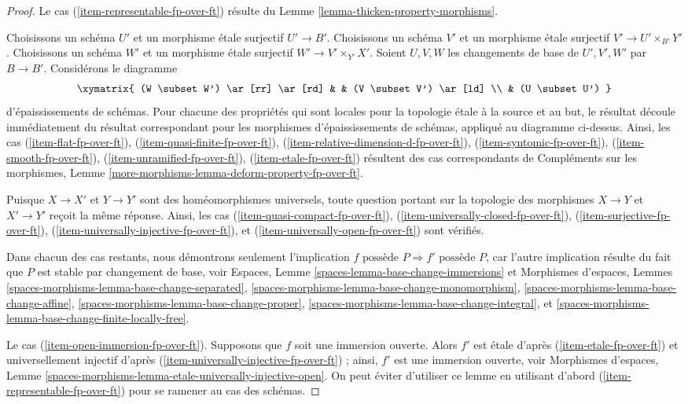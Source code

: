 \begin{proof}
Le cas (\ref{item-representable-fp-over-ft}) résulte du
Lemme \ref{lemma-thicken-property-morphisms}.

\medskip\noindent
Choisissons un schéma $U'$ et un morphisme étale surjectif $U' \to B'$.
Choisissons un schéma $V'$ et un morphisme étale surjectif
$V' \to U' \times_{B'} Y'$.
Choisissons un schéma $W'$ et un morphisme étale surjectif
$W' \to V' \times_{Y'} X'$. Soient $U, V, W$ les changements de base
de $U', V', W'$ par $B \to B'$. Considérons le diagramme
$$
\xymatrix{
(W \subset W') \ar[rr] \ar[rd] & & (V \subset V') \ar[ld] \\
& (U \subset U')
}
$$
d'épaississements de schémas. Pour chacune des propriétés qui sont
locales pour la topologie étale à la source et au but, le résultat découle immédiatement
du résultat correspondant pour les morphismes d'épaississements de schémas,
appliqué au diagramme ci-dessus. Ainsi, les cas
(\ref{item-flat-fp-over-ft}),
(\ref{item-quasi-finite-fp-over-ft}),
(\ref{item-relative-dimension-d-fp-over-ft}),
(\ref{item-syntomic-fp-over-ft}),
(\ref{item-smooth-fp-over-ft}),
(\ref{item-unramified-fp-over-ft}),
(\ref{item-etale-fp-over-ft})
résultent des cas correspondants de
Compléments sur les morphismes, Lemme \ref{more-morphisms-lemma-deform-property-fp-over-ft}.

\medskip\noindent
Puisque $X \to X'$ et $Y \to Y'$ sont des homéomorphismes universels,
toute question portant sur la topologie des morphismes
$X \to Y$ et $X' \to Y'$ reçoit la même réponse. Ainsi,
les cas (\ref{item-quasi-compact-fp-over-ft}),
(\ref{item-universally-closed-fp-over-ft}),
(\ref{item-surjective-fp-over-ft}),
(\ref{item-universally-injective-fp-over-ft}), et
(\ref{item-universally-open-fp-over-ft}) sont vérifiés.

\medskip\noindent
Dans chacun des cas restants, nous démontrons seulement l'implication
$f\text{ possède }P \Rightarrow f'\text{ possède }P$, car l'autre
implication résulte du fait que $P$ est stable par
changement de base, voir
Espaces, Lemme \ref{spaces-lemma-base-change-immersions} et
Morphismes d'espaces, Lemmes
\ref{spaces-morphisms-lemma-base-change-separated},
\ref{spaces-morphisms-lemma-base-change-monomorphism},
\ref{spaces-morphisms-lemma-base-change-affine},
\ref{spaces-morphisms-lemma-base-change-proper},
\ref{spaces-morphisms-lemma-base-change-integral}, et
\ref{spaces-morphisms-lemma-base-change-finite-locally-free}.

\medskip\noindent
Le cas (\ref{item-open-immersion-fp-over-ft}).
Supposons que $f$ soit une immersion ouverte.
Alors $f'$ est étale d'après (\ref{item-etale-fp-over-ft}) et universellement injectif
d'après (\ref{item-universally-injective-fp-over-ft}) ;
ainsi, $f'$ est une immersion ouverte, voir
Morphismes d'espaces, Lemme
\ref{spaces-morphisms-lemma-etale-universally-injective-open}.
On peut éviter d'utiliser ce lemme en
utilisant d'abord (\ref{item-representable-fp-over-ft}) pour se ramener au cas des schémas.


\end{proof}
